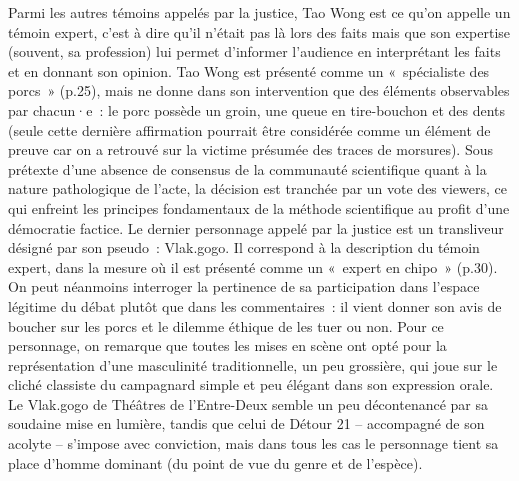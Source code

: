 \documentclass[
]{article}
\begin{document}
Parmi les autres témoins appelés par la justice, Tao Wong est ce qu'on appelle un témoin expert, c'est à dire qu'il n'était pas là lors des faits mais que son expertise (souvent, sa profession) lui permet d'informer l'audience en interprétant les faits et en donnant son opinion. Tao Wong est présenté comme un «~spécialiste des porcs~» (p.25), mais ne donne dans son intervention que des éléments observables par chacun·e~: le porc possède un groin, une queue en tire-bouchon et des dents (seule cette dernière affirmation pourrait être considérée comme un élément de preuve car on a retrouvé sur la victime présumée des traces de morsures). Sous prétexte d'une absence de consensus de la communauté scientifique quant à la nature pathologique de l'acte, la décision est tranchée par un vote des viewers, ce qui enfreint les principes fondamentaux de la méthode scientifique au profit d'une démocratie factice. Le dernier personnage appelé par la justice est un transliveur désigné par son pseudo~: Vlak.gogo. Il correspond à la description du témoin expert, dans la mesure où il est présenté comme un «~expert en chipo~» (p.30). On peut néanmoins interroger la pertinence de sa participation dans l'espace légitime du débat plutôt que dans les commentaires~: il vient donner son avis de boucher sur les porcs et le dilemme éthique de les tuer ou non. Pour ce personnage, on remarque que toutes les mises en scène ont opté pour la représentation d'une masculinité traditionnelle, un peu grossière, qui joue sur le cliché classiste du campagnard simple et peu élégant dans son expression orale. Le Vlak.gogo de Théâtres de l'Entre-Deux semble un peu décontenancé par sa soudaine mise en lumière, tandis que celui de Détour 21 -- accompagné de son acolyte -- s'impose avec conviction, mais dans tous les cas le personnage tient sa place d'homme dominant (du point de vue du genre et de l'espèce).
\end{document}
